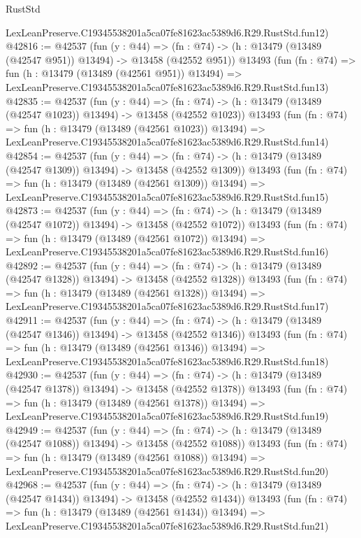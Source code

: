 \begin{lexlean}{RustStd}
\begin{coremodule}
    LexLeanPreserve.C19345538201a5ca07fe81623ac5389d6.R29.RustStd.fun12)
@42816 := @42537
    (fun (y : @44) =>
    (fn : @74) -> (h : @13479 (@13489 (@42547 @951)) @13494) -> @13458 (@42552 @951))
    @13493
    (fun (fn : @74) =>
    fun (h : @13479 (@13489 (@42561 @951)) @13494) =>
    LexLeanPreserve.C19345538201a5ca07fe81623ac5389d6.R29.RustStd.fun13)
@42835 := @42537
    (fun (y : @44) =>
    (fn : @74) -> (h : @13479 (@13489 (@42547 @1023)) @13494) -> @13458 (@42552 @1023))
    @13493
    (fun (fn : @74) =>
    fun (h : @13479 (@13489 (@42561 @1023)) @13494) =>
    LexLeanPreserve.C19345538201a5ca07fe81623ac5389d6.R29.RustStd.fun14)
@42854 := @42537
    (fun (y : @44) =>
    (fn : @74) -> (h : @13479 (@13489 (@42547 @1309)) @13494) -> @13458 (@42552 @1309))
    @13493
    (fun (fn : @74) =>
    fun (h : @13479 (@13489 (@42561 @1309)) @13494) =>
    LexLeanPreserve.C19345538201a5ca07fe81623ac5389d6.R29.RustStd.fun15)
@42873 := @42537
    (fun (y : @44) =>
    (fn : @74) -> (h : @13479 (@13489 (@42547 @1072)) @13494) -> @13458 (@42552 @1072))
    @13493
    (fun (fn : @74) =>
    fun (h : @13479 (@13489 (@42561 @1072)) @13494) =>
    LexLeanPreserve.C19345538201a5ca07fe81623ac5389d6.R29.RustStd.fun16)
@42892 := @42537
    (fun (y : @44) =>
    (fn : @74) -> (h : @13479 (@13489 (@42547 @1328)) @13494) -> @13458 (@42552 @1328))
    @13493
    (fun (fn : @74) =>
    fun (h : @13479 (@13489 (@42561 @1328)) @13494) =>
    LexLeanPreserve.C19345538201a5ca07fe81623ac5389d6.R29.RustStd.fun17)
@42911 := @42537
    (fun (y : @44) =>
    (fn : @74) -> (h : @13479 (@13489 (@42547 @1346)) @13494) -> @13458 (@42552 @1346))
    @13493
    (fun (fn : @74) =>
    fun (h : @13479 (@13489 (@42561 @1346)) @13494) =>
    LexLeanPreserve.C19345538201a5ca07fe81623ac5389d6.R29.RustStd.fun18)
@42930 := @42537
    (fun (y : @44) =>
    (fn : @74) -> (h : @13479 (@13489 (@42547 @1378)) @13494) -> @13458 (@42552 @1378))
    @13493
    (fun (fn : @74) =>
    fun (h : @13479 (@13489 (@42561 @1378)) @13494) =>
    LexLeanPreserve.C19345538201a5ca07fe81623ac5389d6.R29.RustStd.fun19)
@42949 := @42537
    (fun (y : @44) =>
    (fn : @74) -> (h : @13479 (@13489 (@42547 @1088)) @13494) -> @13458 (@42552 @1088))
    @13493
    (fun (fn : @74) =>
    fun (h : @13479 (@13489 (@42561 @1088)) @13494) =>
    LexLeanPreserve.C19345538201a5ca07fe81623ac5389d6.R29.RustStd.fun20)
@42968 := @42537
    (fun (y : @44) =>
    (fn : @74) -> (h : @13479 (@13489 (@42547 @1434)) @13494) -> @13458 (@42552 @1434))
    @13493
    (fun (fn : @74) =>
    fun (h : @13479 (@13489 (@42561 @1434)) @13494) =>
    LexLeanPreserve.C19345538201a5ca07fe81623ac5389d6.R29.RustStd.fun21)

\end{coremodule}
\end{lexlean}
